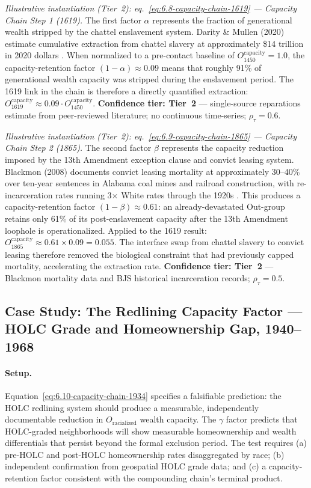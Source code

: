 \noindent\textit{Illustrative instantiation (Tier~2): eq.~\ref{eq:6.8-capacity-chain-1619} --- Capacity Chain Step 1 (1619).} The first factor $\alpha$ represents the fraction of generational wealth stripped by the chattel enslavement system. Darity \& Mullen (2020) estimate cumulative extraction from chattel slavery at approximately \$14 trillion in 2020 dollars \cite{darity_mullen}. When normalized to a pre-contact baseline of $O_{1450}^{\text{capacity}} = 1.0$, the capacity-retention factor $(1-\alpha) \approx 0.09$ means that roughly 91\% of generational wealth capacity was stripped during the enslavement period. The 1619 link in the chain is therefore a directly quantified extraction: $O_{1619}^{\text{capacity}} \approx 0.09 \cdot O_{1450}^{\text{capacity}}$. \textbf{Confidence tier: Tier~2} --- single-source reparations estimate from peer-reviewed literature; no continuous time-series; $\rho_\tau = 0.6$.

\noindent\textit{Illustrative instantiation (Tier~2): eq.~\ref{eq:6.9-capacity-chain-1865} --- Capacity Chain Step 2 (1865).} The second factor $\beta$ represents the capacity reduction imposed by the 13th Amendment exception clause and convict leasing system. Blackmon (2008) documents convict leasing mortality at approximately 30--40\% over ten-year sentences in Alabama coal mines and railroad construction, with re-incarceration rates running 3$\times$ White rates through the 1920s \cite{blackmon}. This produces a capacity-retention factor $(1-\beta) \approx 0.61$: an already-devastated Out-group retains only 61\% of its post-enslavement capacity after the 13th Amendment loophole is operationalized. Applied to the 1619 result: $O_{1865}^{\text{capacity}} \approx 0.61 \times 0.09 = 0.055$. The interface swap from chattel slavery to convict leasing therefore removed the biological constraint that had previously capped mortality, accelerating the extraction rate. \textbf{Confidence tier: Tier~2} --- Blackmon mortality data and BJS historical incarceration records; $\rho_\tau = 0.5$.

\subsection*{Case Study: The Redlining Capacity Factor --- HOLC Grade and Homeownership Gap, 1940--1968}
\label{cs:redlining_capacity}

\paragraph{Setup.}
Equation~\ref{eq:6.10-capacity-chain-1934} specifies a falsifiable prediction: the HOLC redlining system should produce a measurable, independently documentable reduction in $O_{\text{racialized}}$ wealth capacity. The $\gamma$ factor predicts that HOLC-graded neighborhoods will show measurable homeownership and wealth differentials that persist beyond the formal exclusion period. The test requires (a) pre-HOLC and post-HOLC homeownership rates disaggregated by race; (b) independent confirmation from geospatial HOLC grade data; and (c) a capacity-retention factor consistent with the compounding chain's terminal product.

